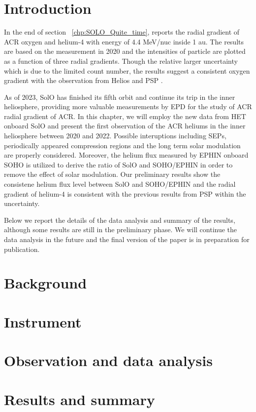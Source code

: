 
\section{Introduction}

In the end of section ~\ref{chp:SOLO_Quite_time}, \citet{Mason-2021-SolOQuietTime} reports the radial gradient of \ac{ACR} oxygen and helium-4 with energy of 4.4 MeV/nuc inside 1 au. The results are based on the measurement in 2020 and the intensities of particle are plotted as a function of three radial gradients. Though the relative larger uncertainty which is due to the limited count number, the results suggest a consistent oxygen gradient
with the observation from Helios and \ac{PSP} \citep{Rankin2021ApJ,Marquardt2018AA}.

As of 2023, \ac{SolO} has finished its fifth orbit and continue its trip in the inner heliosphere, providing more valuable measurements by \ac{EPD} for the study of \ac{ACR} radial gradient of \ac{ACR}. 
In this chapter, we will employ the new data from \ac{HET} onboard \ac{SolO} and present the first observation of the \ac{ACR} heliums in the inner heliosphere between 2020 and 2022. Possible interuptions including \acp{SEP}, periodically appeared compression regions and the long term solar modulation are properly considered. Moreover, the helium flux measured by \ac{EPHIN} onboard \ac{SOHO} is utilized to derive the ratio of \ac{SolO} and \ac{SOHO}/\ac{EPHIN} in order to remove the effect of solar modulation. Our preliminary results show the consistene helium flux level between \ac{SolO} and \ac{SOHO}/\ac{EPHIN} and the radial gradient of helium-4 is consistent with the previous results from \ac{PSP} within the uncertainty.

Below we report the details of the data analysis and summary of the results, although some results are still in the preliminary phase. We will continue the data analysis in the future and the final version of the paper is in preparation for publication.



\section{Background}


\section{Instrument}

\section{Observation and data analysis}

\section{Results and summary}







%
